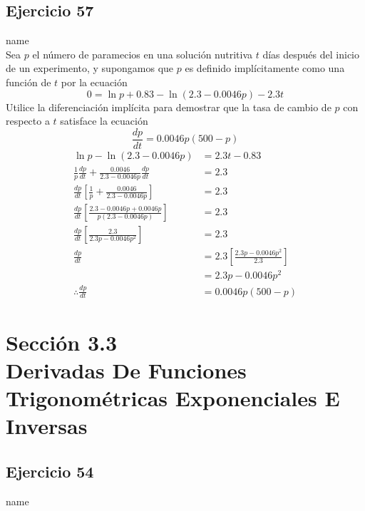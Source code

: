 \documentclass[12pt]{article}
\begin{document}
\subsection{Ejercicio 57} name \\

Sea $p$ el número de paramecios en una solución nutritiva $t$ días después del inicio de un experimento, y supongamos que $p$ es definido implícitamente como una función de $t$ por la ecuación
\[
0 = \ln p + 0.83 − \ln(2.3-
0.0046p) − 2.3t
\]
Utilice la diferenciación implícita para demostrar que la tasa de cambio de $p$ con respecto a $t$ satisface la ecuación
\[
\frac{dp}{dt} = 0.0046p(500-p)
\]
\begin{equation*}
  \begin{split}
    \ln p - \ln(2.3 − 0.0046p)
    &= 2.3t -0.83 \\
    \frac{1}{p}\frac{dp}{dt}+\frac{0.0046}{2.3-0.0046p}\frac{dp}{dt}
    &= 2.3 \\
    \frac{dp}{dt}\left[\frac{1}{p}+\frac{0.0046}{2.3-0.0046p}\right]
    &= 2.3 \\
    \frac{dp}{dt}\left[\frac{2.3-0.0046p+ 0.0046p}{p(2.3-0.0046p)}\right]
    &= 2.3 \\
    \frac{dp}{dt}\left[\frac{2.3}{2.3p-0.0046p^2}\right]
    &= 2.3 \\
    \frac{dp}{dt}
    &= 2.3\left[\frac{2.3p-0.0046p^2}{2.3}\right] \\
    &= 2.3p-0.0046p^2 \\
    \therefore \frac{dp}{dt}
    &= 0.0046p(500-p)
  \end{split}
\end{equation*}

\section{Sección 3.3 \\ Derivadas De Funciones Trigonométricas Exponenciales E Inversas} 
\subsection{Ejercicio 54} name \\
\end{document}
